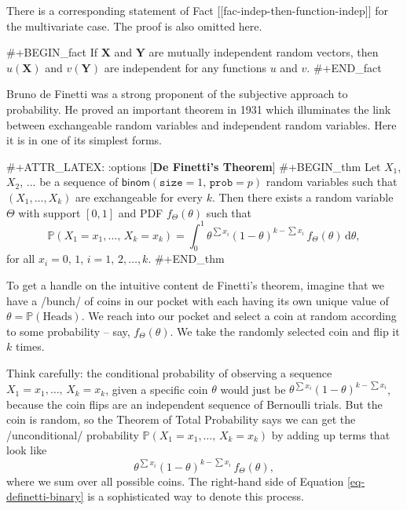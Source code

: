 There is a corresponding statement of Fact
[[fac-indep-then-function-indep]] for the multivariate case. The proof is
also omitted here.

#+BEGIN_fact
If \(\mathbf{X}\) and \(\mathbf{Y}\) are mutually independent random
vectors, then \(u(\mathbf{X})\) and \(v(\mathbf{Y})\) are independent
for any functions \(u\) and \(v\).
#+END_fact

Bruno de Finetti was a strong proponent of the subjective approach to
probability. He proved an important theorem in 1931 which illuminates
the link between exchangeable random variables and independent random
variables. Here it is in one of its simplest forms.

#+ATTR_LATEX: :options [\textbf{De Finetti's Theorem}]
#+BEGIN_thm
Let \(X_{1}\), \(X_{2}\), ... be a sequence of
\(\mathsf{binom}(\mathtt{size}=1,\,\mathtt{prob}=p)\) random variables
such that \((X_{1},\ldots,X_{k})\) are exchangeable for every
\(k\). Then there exists a random variable \(\Theta\) with support
\([0,1]\) and PDF \(f_{\Theta}(\theta)\) such that
\begin{equation}
\label{eq-definetti-binary}
\mathbb{P}(X_{1}=x_{1},\ldots,\, X_{k}=x_{k})=\int_{0}^{1}\theta^{\sum x_{i}}(1-\theta)^{k-\sum x_{i}}\, f_{\Theta}(\theta)\,\mathrm{d}\theta,
\end{equation}
for all \(x_{i}=0,\,1\), \(i=1,\,2,\ldots,k\).
#+END_thm

To get a handle on the intuitive content de Finetti's theorem, imagine
that we have a /bunch/ of coins in our pocket with each having its own
unique value of \(\theta=\mathbb{P}(\mbox{Heads})\). We reach into our
pocket and select a coin at random according to some probability --
say, \(f_{\Theta}(\theta)\). We take the randomly selected coin and
flip it \(k\) times.

Think carefully: the conditional probability of observing a sequence
\(X_{1}=x_{1},\ldots,\, X_{k}=x_{k}\), given a specific coin
\(\theta\) would just be \(\theta^{\sum x_{i}}(1-\theta)^{k-\sum
x_{i}}\), because the coin flips are an independent sequence of
Bernoulli trials. But the coin is random, so the Theorem of Total
Probability says we can get the /unconditional/ probability
\(\mathbb{P}(X_{1}=x_{1},\ldots,\, X_{k}=x_{k})\) by adding up terms
that look like
\begin{equation}
\theta^{\sum x_{i}}(1-\theta)^{k-\sum x_{i}}\, f_{\Theta}(\theta),
\end{equation}
where we sum over all possible coins. The right-hand side of Equation
\eqref{eq-definetti-binary} is a sophisticated way to denote this process.


